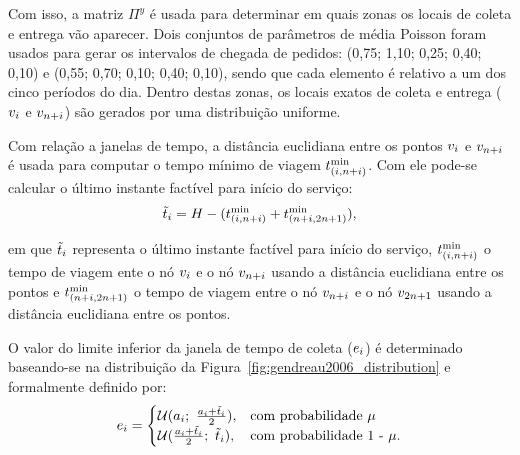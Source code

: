 Com isso, a matriz $\Pi^y$ é usada para determinar em quais zonas os locais de 
coleta e entrega vão aparecer. 
Dois conjuntos de parâmetros de média Poisson foram usados para gerar os 
intervalos de chegada de pedidos: (0,75; 1,10; 0,25; 0,40; 0,10) e 
(0,55; 0,70; 0,10; 0,40; 0,10), sendo que cada elemento é relativo a
um dos cinco períodos do dia. 
Dentro destas zonas, os locais exatos de coleta e entrega 
($v_{i}$ e $v_{n + i}$) são gerados por uma distribuição uniforme.


Com relação a janelas de tempo, a distância euclidiana entre os pontos 
$v_{i}$ e $v_{n + i}$ é usada para computar o tempo mínimo de 
viagem $t_{(i,n + i)}^{\min}$.
Com ele pode-se calcular o último instante factível para início do serviço:
%
\begin{equation}
  \Tilde{t}_{i} = H 
    - (t_{(i,n + i)}^{\min} 
    + t_{(n + i,2n + 1)}^{\min}),
    \label{eq:gendreau2006_leat_feasible_time}
\end{equation}

\noindent em que $\Tilde{t}_i$ representa o último instante factível 
para início do serviço,
$t_{(i,n + i)}^{\min}$ o tempo de
viagem ente o nó $v_{i}$ e o nó $v_{n + i}$ usando a distância 
euclidiana entre os pontos e
$t_{(n + i,2n + 1)}^{\min}$ o tempo de viagem entre 
o nó $v_{n + i}$ e o nó $v_{2n + 1}$ usando a distância euclidiana entre 
os pontos.


O valor do limite inferior da janela de tempo de coleta
($e_i$) é determinado baseando-se na 
distribuição da Figura~\ref{fig:gendreau2006_distribution} e formalmente 
definido por:
%
\begin{equation}
  e_i = 
    \begin{cases}
      \mathcal{U}(a_i;\ \frac{a_i + \Tilde{t}_i}{2}), 
        & \text{com probabilidade $\mu$} \\
      \mathcal{U}(\frac
        {a_i + \Tilde{t}_i}{2};\ \Tilde{t}_i), 
        & \text{com probabilidade 1 - $\mu$}.
    \end{cases}
\label{eq:gendreau2006_earliestTimewindow}
\end{equation}

